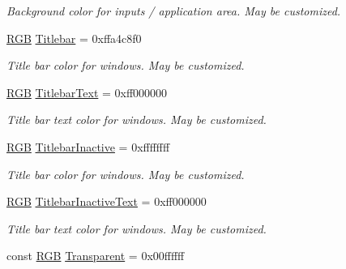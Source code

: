 \begin{DoxyCompactItemize}
\begin{DoxyCompactList}\small\item\em Background color for inputs / application area. May be customized. \end{DoxyCompactList}\item 
\hypertarget{namespaceGUI_1_1Color_ad920563eb1961c9b846af6daa8e5f8c7}{\hyperlink{namespaceGUI_aeafd135255365f3584da0e982fc79466}{R\-G\-B} \hyperlink{namespaceGUI_1_1Color_ad920563eb1961c9b846af6daa8e5f8c7}{Titlebar} = 0xffa4c8f0}\label{namespaceGUI_1_1Color_ad920563eb1961c9b846af6daa8e5f8c7}

\begin{DoxyCompactList}\small\item\em Title bar color for windows. May be customized. \end{DoxyCompactList}\item 
\hypertarget{namespaceGUI_1_1Color_abae1054f06525ac5741b40bffe83fdbf}{\hyperlink{namespaceGUI_aeafd135255365f3584da0e982fc79466}{R\-G\-B} \hyperlink{namespaceGUI_1_1Color_abae1054f06525ac5741b40bffe83fdbf}{Titlebar\-Text} = 0xff000000}\label{namespaceGUI_1_1Color_abae1054f06525ac5741b40bffe83fdbf}

\begin{DoxyCompactList}\small\item\em Title bar text color for windows. May be customized. \end{DoxyCompactList}\item 
\hypertarget{namespaceGUI_1_1Color_a73892e5f611b394cf296220a48154093}{\hyperlink{namespaceGUI_aeafd135255365f3584da0e982fc79466}{R\-G\-B} \hyperlink{namespaceGUI_1_1Color_a73892e5f611b394cf296220a48154093}{Titlebar\-Inactive} = 0xffffffff}\label{namespaceGUI_1_1Color_a73892e5f611b394cf296220a48154093}

\begin{DoxyCompactList}\small\item\em Title bar color for windows. May be customized. \end{DoxyCompactList}\item 
\hypertarget{namespaceGUI_1_1Color_a9ea5ec7a1ac3f8a8deefc8de7d45a5bf}{\hyperlink{namespaceGUI_aeafd135255365f3584da0e982fc79466}{R\-G\-B} \hyperlink{namespaceGUI_1_1Color_a9ea5ec7a1ac3f8a8deefc8de7d45a5bf}{Titlebar\-Inactive\-Text} = 0xff000000}\label{namespaceGUI_1_1Color_a9ea5ec7a1ac3f8a8deefc8de7d45a5bf}

\begin{DoxyCompactList}\small\item\em Title bar text color for windows. May be customized. \end{DoxyCompactList}\item 
\hypertarget{namespaceGUI_1_1Color_a7ec3cc2d0178f404a31dac73d2048a10}{const \hyperlink{namespaceGUI_aeafd135255365f3584da0e982fc79466}{R\-G\-B} \hyperlink{namespaceGUI_1_1Color_a7ec3cc2d0178f404a31dac73d2048a10}{Transparent} = 0x00ffffff}\label{namespaceGUI_1_1Color_a7ec3cc2d0178f404a31dac73d2048a10}


\end{DoxyCompactItemize}
